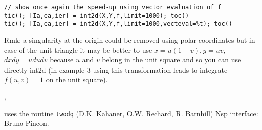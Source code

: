 \begin{examples}
\begin{Verbatim}
// show once again the speed-up using vector evaluation of f
tic(); [Ia,ea,ier] = int2d(X,Y,f,limit=1000); toc()
tic(); [Ia,ea,ier] = int2d(X,Y,f,limit=1000,vecteval=%t); toc()
\end{Verbatim}
Rmk: a singularity at the origin could be removed using polar
coordinates but in case of the unit triangle it may be better
to use $x = u(1-v), y = uv$, $dxdy = u dudv$ because $u$ and $v$
belong in the unit square and so you can use directly int2d
(in example 3 using this transformation leads to integrate $f(u,v)=1$
on the unit square). 
\end{examples}

\begin{manseealso}
  ,   
\end{manseealso}

\begin{authors}
  uses the routine \verb!twodq! (D.K. Kahaner, O.W. Rechard, R. Barnhill)
  Nsp interface: Bruno Pincon.
\end{authors}
